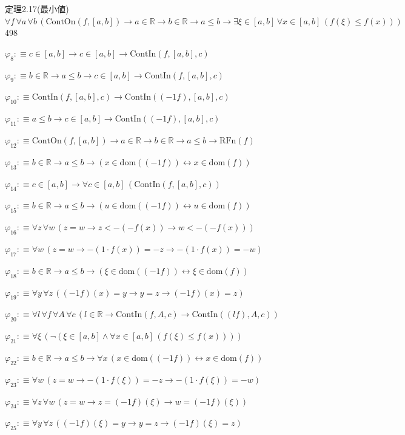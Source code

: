 \begin{fullproof}{定理2.17(最小値)}{$\forall f\,\forall a\,\forall b\,(\mathrm{ContOn}(f,[a,b]) \to a \in \mathbb{R} \to b \in \mathbb{R} \to a \leq b \to \exists \xi \in [a,b]\,\forall x \in [a,b]\,(f(\xi) \leq f(x)))$}{498}
\begin{abbrevlist}
\item $\varphi_{8} :\equiv c \in [a,b] \to c \in [a,b] \to \mathrm{ContIn}(f,[a,b],c)$
\item $\varphi_{9} :\equiv b \in \mathbb{R} \to a \leq b \to c \in [a,b] \to \mathrm{ContIn}(f,[a,b],c)$
\item $\varphi_{10} :\equiv \mathrm{ContIn}(f,[a,b],c) \to \mathrm{ContIn}((-1 f),[a,b],c)$
\item $\varphi_{11} :\equiv a \leq b \to c \in [a,b] \to \mathrm{ContIn}((-1 f),[a,b],c)$
\item $\varphi_{12} :\equiv \mathrm{ContOn}(f,[a,b]) \to a \in \mathbb{R} \to b \in \mathbb{R} \to a \leq b \to \mathrm{RFn}(f)$
\item $\varphi_{13} :\equiv b \in \mathbb{R} \to a \leq b \to (x \in \mathrm{dom}((-1 f)) \leftrightarrow x \in \mathrm{dom}(f))$
\item $\varphi_{14} :\equiv c \in [a,b] \to \forall c \in [a,b]\,(\mathrm{ContIn}(f,[a,b],c))$
\item $\varphi_{15} :\equiv b \in \mathbb{R} \to a \leq b \to (u \in \mathrm{dom}((-1 f)) \leftrightarrow u \in \mathrm{dom}(f))$
\item $\varphi_{16} :\equiv \forall z\,\forall w\,(z = w \to z < -(-f(x)) \to w < -(-f(x)))$
\item $\varphi_{17} :\equiv \forall w\,(z = w \to -(1 \cdot f(x)) = -z \to -(1 \cdot f(x)) = -w)$
\item $\varphi_{18} :\equiv b \in \mathbb{R} \to a \leq b \to (\xi \in \mathrm{dom}((-1 f)) \leftrightarrow \xi \in \mathrm{dom}(f))$
\item $\varphi_{19} :\equiv \forall y\,\forall z\,((-1 f)(x) = y \to y = z \to (-1 f)(x) = z)$
\item $\varphi_{20} :\equiv \forall l\,\forall f\,\forall A\,\forall c\,(l \in \mathbb{R} \to \mathrm{ContIn}(f,A,c) \to \mathrm{ContIn}((l f),A,c))$
\item $\varphi_{21} :\equiv \forall \xi\,(\neg (\xi \in [a,b] \land \forall x \in [a,b]\,(f(\xi) \leq f(x))))$
\item $\varphi_{22} :\equiv b \in \mathbb{R} \to a \leq b \to \forall x\,(x \in \mathrm{dom}((-1 f)) \leftrightarrow x \in \mathrm{dom}(f))$
\item $\varphi_{23} :\equiv \forall w\,(z = w \to -(1 \cdot f(\xi)) = -z \to -(1 \cdot f(\xi)) = -w)$
\item $\varphi_{24} :\equiv \forall z\,\forall w\,(z = w \to z = (-1 f)(\xi) \to w = (-1 f)(\xi))$
\item $\varphi_{25} :\equiv \forall y\,\forall z\,((-1 f)(\xi) = y \to y = z \to (-1 f)(\xi) = z)$

\end{abbrevlist}
\end{fullproof}
